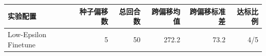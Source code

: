 \begin{tabular}{lrrrrr}\toprule
实验配置 & 种子偏移数 & 总回合数 & 跨偏移均值 & 跨偏移标准差 & 达标比例 \\
\midrule
Low-Epsilon Finetune & 5 & 50 & 272.2 & 73.2 & 4/5 \\
\bottomrule
\end{tabular}
